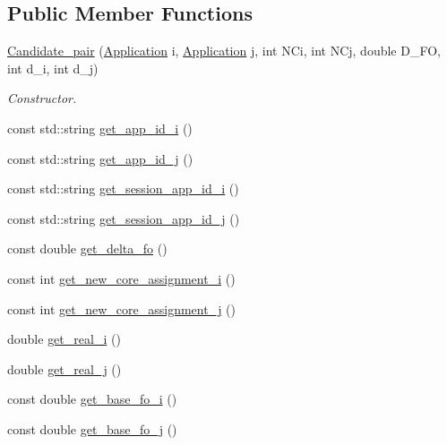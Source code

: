 \subsection*{Public Member Functions}
\begin{DoxyCompactItemize}
\item 
\hyperlink{classCandidate__pair_a59168f369264a7cd8bd7ddb16f23c785}{Candidate\-\_\-pair} (\hyperlink{classApplication}{Application} i, \hyperlink{classApplication}{Application} j, int N\-Ci, int N\-Cj, double D\-\_\-\-F\-O, int d\-\_\-i, int d\-\_\-j)
\begin{DoxyCompactList}\small\item\em Constructor. \end{DoxyCompactList}\item 
const std\-::string \hyperlink{classCandidate__pair_a8fcc74d1e2ad95ab0ecb483a2ceb39b0}{get\-\_\-app\-\_\-id\-\_\-i} ()
\item 
const std\-::string \hyperlink{classCandidate__pair_aaee11e17681cfe95daed61e23b3bd6dc}{get\-\_\-app\-\_\-id\-\_\-j} ()
\item 
const std\-::string \hyperlink{classCandidate__pair_a3d7cb54ffabff340b583925427424085}{get\-\_\-session\-\_\-app\-\_\-id\-\_\-i} ()
\item 
const std\-::string \hyperlink{classCandidate__pair_a8e2faa0c4a09de7667d760a7de0b9596}{get\-\_\-session\-\_\-app\-\_\-id\-\_\-j} ()
\item 
const double \hyperlink{classCandidate__pair_a4d45f63a1ffc4d420b28e88ae7e1dc99}{get\-\_\-delta\-\_\-fo} ()
\item 
const int \hyperlink{classCandidate__pair_a986854ee106c5d7cb64a7ab1161963f2}{get\-\_\-new\-\_\-core\-\_\-assignment\-\_\-i} ()
\item 
const int \hyperlink{classCandidate__pair_ab008e2c787a8ee44ab0102a280d9bea6}{get\-\_\-new\-\_\-core\-\_\-assignment\-\_\-j} ()
\item 
double \hyperlink{classCandidate__pair_a829335d66b073892cba3a89a90a9c5c8}{get\-\_\-real\-\_\-i} ()
\item 
double \hyperlink{classCandidate__pair_af2dc9a093dced6724b85018cfdb307cd}{get\-\_\-real\-\_\-j} ()
\item 
const double \hyperlink{classCandidate__pair_a82a48babd2f32c73e1f167d54e8c6ebd}{get\-\_\-base\-\_\-fo\-\_\-i} ()
\item 
const double \hyperlink{classCandidate__pair_a3f36cbb93291e8a72a6b3e88737d2a85}{get\-\_\-base\-\_\-fo\-\_\-j} ()
\item 

\end{DoxyCompactItemize}
